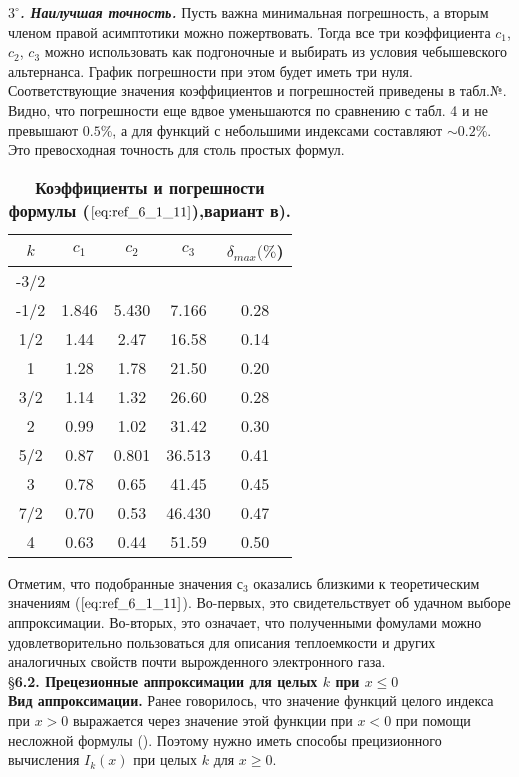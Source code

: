 \textbf{\textit{$3^{\circ}$. Наилучшая точность.}} Пусть важна минимальная погрешность, а вторым членом правой асимптотики можно пожертвовать. Тогда все три коэффициента $c_1$, $c_2$, $c_3$ можно использовать как подгоночные и выбирать из условия чебышевского альтернанса. График погрешности
при этом будет иметь три нуля. Соответствующие значения коэффициентов и погрешностей приведены в табл.№. Видно, что погрешности еще вдвое уменьшаются по сравнению с табл. 4 и не превышают $0.5 \%$, а для функций с небольшими индексами составляют $\sim 0.2\%$. Это превосходная точность для столь простых формул.
\begin{table}[]
\caption{\textbf{Коэффициенты и погрешности формулы ($\ref{eq:ref_6_1_11}$),вариант в).}}
\begin{center}
\begin{tabular}{|c|c|c|c|c|}
\hline
$k$ & $c_1$ & $c_2$ & $c_3$ & $\delta_{max} (\%$) \\
\hline
-3/2 & & & \\
-1/2 & 1.846 & 5.430 & 7.166 & 0.28 \\
 1/2 & 1.44  & 2.47  & 16.58 & 0.14 \\
  1  & 1.28  & 1.78  & 21.50 & 0.20 \\
 3/2 & 1.14  & 1.32  & 26.60 & 0.28 \\
  2  & 0.99  & 1.02  & 31.42 & 0.30 \\
 5/2 & 0.87  & 0.801 & 36.513 & 0.41 \\
  3  & 0.78  & 0.65  & 41.45 & 0.45 \\
 7/2 & 0.70  & 0.53  & 46.430 & 0.47 \\
  4  & 0.63  & 0.44  & 51.59 & 0.50 \\
\hline
\end{tabular}
\end{center}
\end{table}

Отметим, что подобранные значения $с_3$ оказались близкими к теоретическим значениям
($\ref{eq:ref_6_1_11}$). Во-первых, это свидетельствует об удачном выборе аппроксимации. Во-вторых, это означает, что полученными фомулами можно удовлетворительно пользоваться для описания теплоемкости и других аналогичных свойств почти вырожденного электронного газа.
\\

\S \textbf{6.2. Прецезионные аппроксимации для целых $k$ при $x \leqslant 0$}
\\

\textbf{Вид аппроксимации.} Ранее говорилось, что значение функций целого индекса при $x > 0$ выражается через значение этой функции при $x < 0$ при помощи несложной формулы (). Поэтому нужно иметь способы прецизионного вычисления $I_k(x)$ при целых $k$ для $x \geqslant 0$. 

